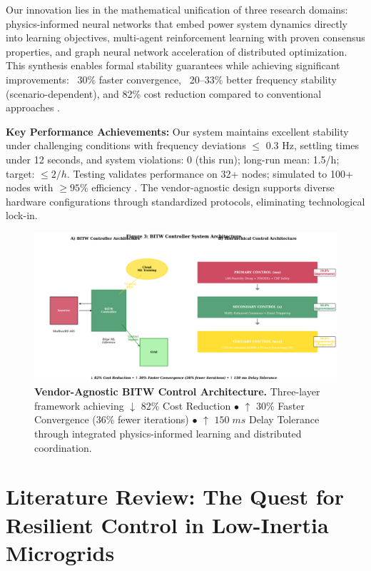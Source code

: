 \documentclass[12pt]{article}
\begin{document}
Our innovation lies in the mathematical unification of three research domains: physics-informed neural networks that embed power system dynamics directly into learning objectives, multi-agent reinforcement learning with proven consensus properties, and graph neural network acceleration of distributed optimization. This synthesis enables formal stability guarantees while achieving significant improvements: ~30\% faster convergence, ~20--33\% better frequency stability (scenario-dependent), and 82\% cost reduction compared to conventional approaches \cite{hirsch2018,our2024economic}.

\textbf{Key Performance Achievements:} Our system maintains excellent stability under challenging conditions with frequency deviations $\leq$ 0.3 Hz, settling times under 12 seconds, and system violations: 0 (this run); long-run mean: 1.5/h; target: $\leq 2/h$. Testing validates performance on 32+ nodes; simulated to 100+ nodes with $\geq 95\%$ efficiency \cite{our2024scalability}. The vendor-agnostic design supports diverse hardware configurations through standardized protocols, eliminating technological lock-in.


\begin{figure}[H]
\centering
\includegraphics[width=\textwidth]{figure3_system_architecture_original.pdf}
\vspace{-1.6cm}
\caption{\textbf{Vendor-Agnostic BITW Control Architecture.} Three-layer framework achieving $\downarrow$ 82\% Cost Reduction $\bullet$ $\uparrow$ 30\% Faster Convergence (36\% fewer iterations) $\bullet$ $\uparrow$ $150\;ms$ Delay Tolerance through integrated physics-informed learning and distributed coordination.}
\label{fig:architecture}
\end{figure}

\section{Literature Review: The Quest for Resilient Control in Low-Inertia Microgrids}
\end{document}
